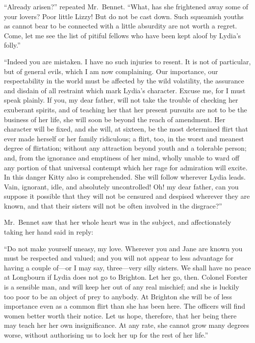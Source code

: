 ``Already arisen?'' repeated Mr.\ Bennet.  ``What, has she
frightened away some of your lovers?  Poor little Lizzy!  But do
not be cast down.  Such squeamish youths as cannot bear to be
connected with a little absurdity are not worth a regret.  Come,
let me see the list of pitiful fellows who have been kept aloof
by Lydia's folly.''

``Indeed you are mistaken.  I have no such injuries to resent.
It is not of particular, but of general evils, which I am now
complaining.  Our importance, our respectability in the world must
be affected by the wild volatility, the assurance and disdain of
all restraint which mark Lydia's character.  Excuse me, for I must
speak plainly.  If you, my dear father, will not take the trouble
of checking her exuberant spirits, and of teaching her that her
present pursuits are not to be the business of her life, she will
soon be beyond the reach of amendment.  Her character will be
fixed, and she will, at sixteen, be the most determined flirt that
ever made herself or her family ridiculous; a flirt, too, in the
worst and meanest degree of flirtation; without any attraction
beyond youth and a tolerable person; and, from the ignorance and
emptiness of her mind, wholly unable to ward off any portion of
that universal contempt which her rage for admiration will excite.
In this danger Kitty also is comprehended.  She will follow wherever
Lydia leads.  Vain, ignorant, idle, and absolutely uncontrolled!
Oh! my dear father, can you suppose it possible that they will not
be censured and despised wherever they are known, and that their
sisters will not be often involved in the disgrace?''

Mr.\ Bennet saw that her whole heart was in the subject, and
affectionately taking her hand said in reply:

``Do not make yourself uneasy, my love.  Wherever you and Jane
are known you must be respected and valued; and you will not
appear to less advantage for having a couple of---or I may say,
three---very silly sisters.  We shall have no peace at Longbourn
if Lydia does not go to Brighton.  Let her go, then.  Colonel
Forster is a sensible man, and will keep her out of any real
mischief; and she is luckily too poor to be an object of prey
to anybody.  At Brighton she will be of less importance even as
a common flirt than she has been here.  The officers will find
women better worth their notice.  Let us hope, therefore, that
her being there may teach her her own insignificance.  At any
rate, she cannot grow many degrees worse, without authorising
us to lock her up for the rest of her life.''

